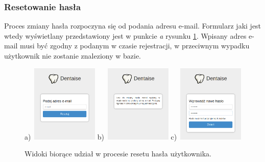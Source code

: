 \documentclass[11pt]{aghdpl}
\begin{document}
\subsubsection{Resetowanie hasła}
\label{sec:resetowanieHaslaWidok}


Proces zmiany hasła rozpoczyna się od podania adresu e-mail. Formularz jaki jest wtedy wyświetlany przedstawiony jest w punkcie \emph{a} rysunku \ref{fig:resetHasla}. Wpisany adres e-mail musi być zgodny z podanym w czasie rejestracji, w przeciwnym wypadku użytkownik nie zostanie znaleziony w bazie.

\begin{figure}[h!]
	\begin{center}
		a)~\includegraphics[width=0.28\textwidth]{reset-hasla-1}
		\hspace{5mm}
		b)~\includegraphics[width=0.28\textwidth]{reset-hasla-2}
		\hspace{5mm}
		c)~\includegraphics[width=0.28\textwidth]{reset-hasla-3}
	\end{center}
	\caption{Widoki biorące udział w procesie resetu hasła użytkownika.}
	\label{fig:resetHasla}
\end{figure}
\end{document}
